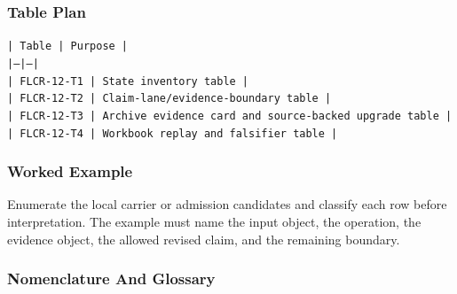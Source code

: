 \documentclass[11pt]{article}
\begin{document}
\subsubsection*{Table Plan}

\noindent\texttt{| Table | Purpose |}\\
\noindent\texttt{|---|---|}\\
\noindent\texttt{| FLCR-12-T1 | State inventory table |}\\
\noindent\texttt{| FLCR-12-T2 | Claim-lane/evidence-boundary table |}\\
\noindent\texttt{| FLCR-12-T3 | Archive evidence card and source-backed upgrade table |}\\
\noindent\texttt{| FLCR-12-T4 | Workbook replay and falsifier table |}\\

\subsubsection*{Worked Example}

Enumerate the local carrier or admission candidates and classify each row before interpretation. The example must name the input object, the operation,
the evidence object, the allowed revised claim, and the remaining boundary.

\subsubsection*{Nomenclature And Glossary}
\end{document}
